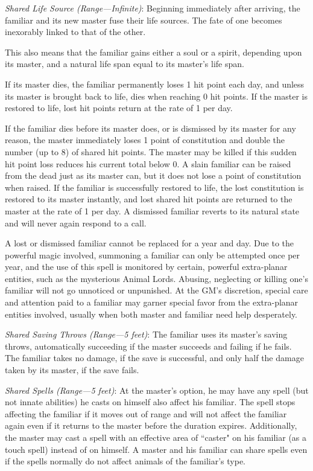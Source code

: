 \begin{multicols}{2}
\textit{Shared Life Source (Range---Infinite)}: Beginning immediately after arriving, the familiar and its new master fuse their life sources.  The fate of one becomes inexorably linked to that of the other.  

This also means that the familiar gains either a soul or a spirit, depending upon its master, and a natural life span equal to its master's life span.  

If its master dies, the familiar permanently loses 1 hit point each day, and unless its master is brought back to life, dies when reaching 0 hit points.  If the master is restored to life, lost hit points return at the rate of 1 per day.

If the familiar dies before its master does, or is dismissed by its master for any reason, the master immediately loses 1 point of constitution and double the number (up to 8) of shared hit points.  The master may be killed if this sudden hit point loss reduces his current total below 0.  A slain familiar can be raised from the dead just as its master can, but it does not lose a point of constitution when raised.  If the familiar is successfully restored to life, the lost constitution is restored to its master instantly, and lost shared hit points are returned to the master at the rate of 1 per day.  A dismissed familiar reverts to its natural state and will never again respond to a call.    

A lost or dismissed familiar cannot be replaced for a year and day.  Due to the powerful magic involved, summoning a familiar can only be attempted once per year, and the use of this spell is monitored by certain, powerful extra-planar entities, such as the mysterious Animal Lords.  Abusing, neglecting or killing one's familiar will not go unnoticed or unpunished.  At the GM's discretion, special care and attention paid to a familiar may garner special favor from the extra-planar entities involved, usually when both master and familiar need help desperately.   

\textit{Shared Saving Throws (Range---5 feet)}: The familiar uses its master's saving throws, automatically succeeding if the master succeeds and failing if he fails.  The familiar takes no damage, if the save is successful, and only half the damage taken by its master, if the save fails.

\textit{Shared Spells (Range---5 feet)}: At the master's option, he may have any spell (but not innate abilities) he casts on himself also affect his familiar.  The spell stops affecting the familiar if it moves out of range and will not affect the familiar again even if it returns to the master before the duration expires.  Additionally, the master may cast a spell with an effective area of ``caster" on his familiar (as a touch spell) instead of on himself.  A master and his familiar can share spells even if the spells normally do not affect animals of the familiar's type. 
 

\end{multicols}
